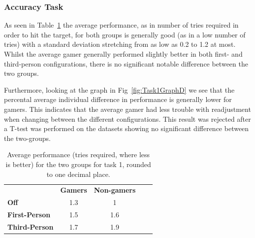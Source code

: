 \documentclass[runningheads,a4paper,oribibl]{llncs}
\begin{document}
\subsubsection{Accuracy Task}
As seen in Table~\ref{tab:Task1GraphP} the average performance, as in number of tries required in order to hit the target, for both groups is generally good (as in a low number of tries) with a standard deviation stretching from as low as 0.2 to 1.2 at most. Whilst the average gamer generally performed slightly better in both first- and third-person configurations, there is no significant notable difference between the two groups.


Furthermore, looking at the graph in Fig~\ref{fig:Task1GraphD} we see that the percental average individual difference in performance is generally lower for gamers. This indicates that the average gamer had less trouble with readjustment when changing between the different configurations. This result was rejected after a T-test was performed on the datasets showing no significant difference between the two-groups.  


\begin{table}[]
\centering
\label{tab:Task1GraphP}
\setlength{\tabcolsep}{1em}
\def\arraystretch{1.8}
\begin{tabular}{l|c|cll}
                      & {\textbf{Gamers}} & {\textbf{Non-gamers}} &  &  \\ \cline{1-3}
\textbf{Off}          & 1.3                                    & 1                                          &  &  \\ \cline{1-3}
\textbf{First-Person} & 1.5                                    & 1.6                                        &  &  \\ \cline{1-3}
\textbf{Third-Person} & 1.7                                    & 1.9                                        &  & 
\end{tabular}
\caption{Average performance (tries required, where less is better) for the two groups for task 1, rounded to one decimal place.}
\end{table}




\end{document}
